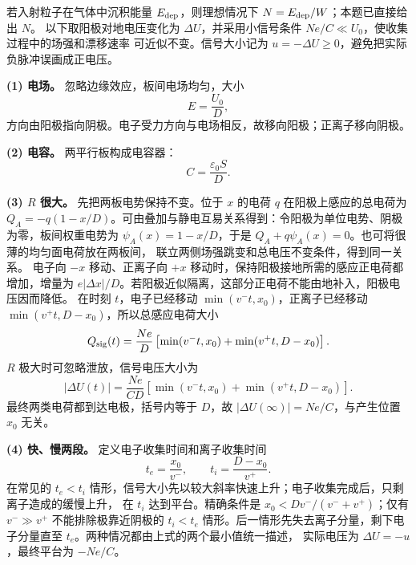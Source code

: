 {\begin{xesolution}
若入射粒子在气体中沉积能量 $E_{\rm dep}$，则理想情况下 $N=E_{\rm dep}/W$；本题已直接给出 $N$。
以下取阳极对地电压变化为 $\Delta U$，并采用小信号条件 $Ne/C\ll U_0$，使收集过程中的场强和漂移速率
可近似不变。信号大小记为 $u=-\Delta U\ge0$，避免把实际负脉冲误画成正电压。

\textbf{(1) 电场。} 忽略边缘效应，板间电场均匀，大小
\[
  \boxed{E=\frac{U_0}{D}},
\]
方向由阳极指向阴极。电子受力方向与电场相反，故移向阳极；正离子移向阴极。

\textbf{(2) 电容。} 两平行板构成电容器：
\[
  \boxed{C=\frac{\varepsilon_0S}{D}}.
\]

\textbf{(3) $R$ 很大。} 先把两板电势保持不变。位于 $x$ 的电荷 $q$ 在阳极上感应的总电荷为
$Q_A=-q(1-x/D)$。可由叠加与静电互易关系得到：令阳极为单位电势、阴极为零，板间权重电势为
$\psi_A(x)=1-x/D$，于是 $Q_A+q\psi_A(x)=0$。也可将很薄的均匀面电荷放在两板间，
联立两侧场强跳变和总电压不变条件，得到同一关系。
电子向 $-x$ 移动、正离子向 $+x$ 移动时，保持阳极接地所需的感应正电荷都增加，增量为
$e|\Delta x|/D$。若阳极近似隔离，这部分正电荷不能由地补入，阳极电压因而降低。
在时刻 $t$，电子已经移动
$\min(v^-t,x_0)$，正离子已经移动 $\min(v^+t,D-x_0)$，所以总感应电荷大小
\[
  Q_{\rm sig}(t)=\frac{Ne}{D}
  \left[\min(v^-t,x_0)+\min(v^+t,D-x_0)\right].
\]
$R$ 极大时可忽略泄放，信号电压大小为
\[
  \boxed{|\Delta U(t)|=\frac{Ne}{CD}
  \left[\min(v^-t,x_0)+\min(v^+t,D-x_0)\right]}.
\]
最终两类电荷都到达电极，括号内等于 $D$，故 $|\Delta U(\infty)|=Ne/C$，与产生位置 $x_0$ 无关。

\textbf{(4) 快、慢两段。} 定义电子收集时间和离子收集时间
\[
  t_e=\frac{x_0}{v^-},\qquad t_i=\frac{D-x_0}{v^+}.
\]
在常见的 $t_e<t_i$ 情形，信号大小先以较大斜率快速上升；电子收集完成后，只剩离子造成的缓慢上升，
在 $t_i$ 达到平台。精确条件是 $x_0<Dv^-/(v^-+v^+)$；仅有 $v^-\gg v^+$ 不能排除极靠近阴极的
$t_i<t_e$ 情形。后一情形先失去离子分量，剩下电子分量直至 $t_e$。两种情况都由上式的两个最小值统一描述，
实际电压为 $\Delta U=-u$，最终平台为 $-Ne/C$。

\par\noindent\begin{minipage}{\linewidth}
\ionSignalFigure
{}
\end{minipage}\par\medskip


\end{xesolution}}
